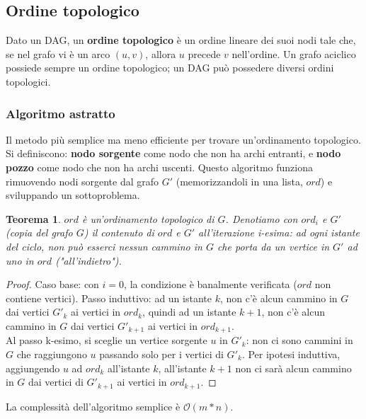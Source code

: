 \documentclass[11pt]{article}
\newtheorem*{theorem}{Teorema}
\begin{document}
\subsection{Ordine topologico}
Dato un DAG, un \textbf{ordine topologico} è un ordine lineare dei suoi nodi tale che, se nel grafo vi è un arco $(u,v)$, 
allora $u$ precede $v$ nell'ordine. Un grafo aciclico possiede sempre un ordine topologico; un DAG può possedere diversi 
ordini topologici.
\subsubsection{Algoritmo astratto}
Il metodo più semplice ma meno efficiente per trovare un'ordinamento topologico. Si definiscono: \textbf{nodo sorgente} 
come nodo che non ha archi entranti, e \textbf{nodo pozzo} come nodo che non ha archi uscenti. Questo algoritmo funziona
rimuovendo nodi sorgente dal grafo $G'$ (memorizzandoli in una lista, $ord$) e sviluppando un sottoproblema.
\begin{theorem}
    $ord$ è un'ordinamento topologico di $G$. Denotiamo con $ord_i$ e $G'$ (copia del grafo $G$) il contenuto di $ord$ e
    $G'$ all'iterazione i-esima: ad ogni istante del ciclo, non può esserci nessun cammino in $G$ che porta da un vertice 
    in $G'$ ad uno in $ord$ ("all'indietro").
\end{theorem}
\begin{proof}
    Caso base: con $i=0$, la condizione è banalmente verificata ($ord$ non contiene vertici).
    Passo induttivo: ad un istante $k$, non c'è alcun cammino in $G$ dai vertici $G'_k$ ai vertici in $ord_k$, quindi 
    ad un istante $k+1$, non c'è alcun cammino in $G$ dai vertici $G'_{k+1}$ ai vertici in $ord_{k+1}$.\\
    Al passo k-esimo, si sceglie un vertice sorgente $u$ in $G'_k$: non ci sono cammini in $G$ che raggiungono $u$ passando solo 
    per i vertici di $G'_k$. Per ipotesi induttiva, aggiungendo $u$ ad $ord_k$ all'istante $k$, all'istante $k+1$ non ci 
    sarà alcun cammino in $G$ dai vertici di $G'_{k+1}$ ai vertici in $ord_{k+1}$.
\end{proof}
La complessità dell'algoritmo semplice è $\mathcal{O}(m*n)$.
\end{document}
